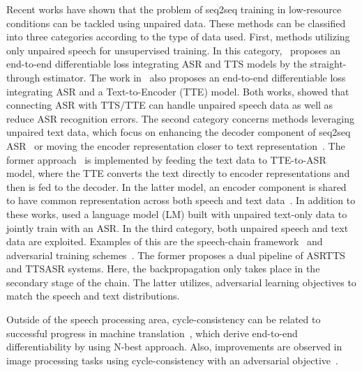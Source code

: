 \documentclass[a4paper]{article}
\begin{document}
Recent works have shown that the problem of seq2seq training in low-resource conditions can be tackled using unpaired data. These methods can be classified into three categories according to the type of data used. First, methods utilizing only unpaired speech for unsupervised training. In this category,~\cite{tjandra2018end} proposes an end-to-end differentiable loss integrating ASR and TTS models by the straight-through estimator. The work in~\cite{hori2018cycle} also proposes an end-to-end differentiable loss integrating ASR and a Text-to-Encoder (TTE) model. Both works, showed that connecting ASR with TTS/TTE can handle unpaired speech data as well as reduce ASR recognition errors.
The second category concerns methods leveraging unpaired text data, which focus on enhancing the decoder component of seq2seq ASR~\cite{hayashi2018back} or moving the encoder representation closer to text representation~\cite{renduchintala2018multi}. The former approach~\cite{hayashi2018back} is implemented by feeding the text data to TTE-to-ASR~\cite{hayashi2018back} model, where the TTE converts the text directly to encoder representations and then is fed to the decoder. In the latter model, 
an encoder component is shared to have common representation across both speech and text data~\cite{renduchintala2018multi}. In addition to these works, \cite{liuLM} used a language model (LM) built with unpaired text-only data to jointly train with an ASR. In the third category, both unpaired speech and text data are exploited. Examples of this are the speech-chain framework~\cite{tjandra2017listening} and adversarial training schemes~\cite{drexler2018combining,karita2018sequence}. The former proposes a dual pipeline of ASRTTS and TTSASR systems. Here, the backpropagation only takes place in the secondary stage of the chain. The latter utilizes, adversarial learning objectives to match the speech and text distributions.

Outside of the speech processing area, cycle-consistency can be related to successful progress in machine translation~\cite{he2016dual}, which derive end-to-end differentiability by using N-best approach. Also, improvements are observed in image processing tasks using cycle-consistency with an adversarial objective~\cite{zhu2017unpaired}.
\end{document}
